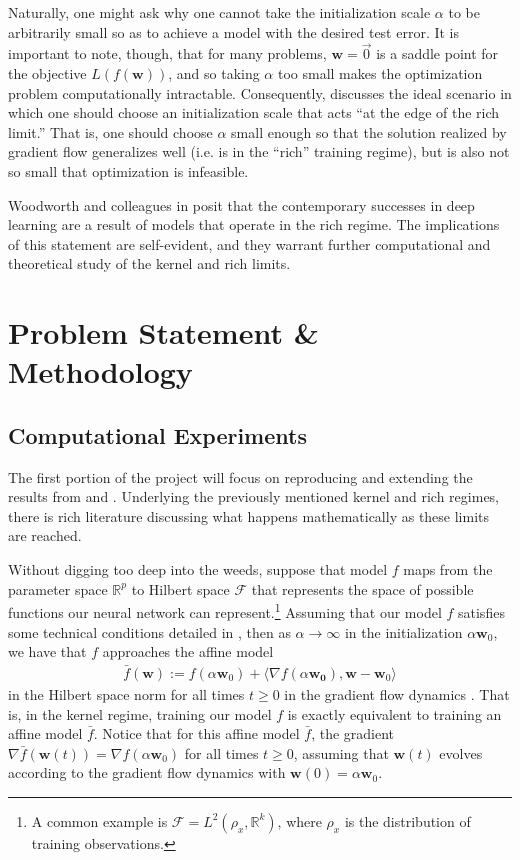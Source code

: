 \documentclass{article}
\begin{document}
Naturally, one might ask why one cannot take the initialization scale $\alpha$ to be arbitrarily small so as to achieve a model with the desired test error. It is important to note, though, that for many problems, $\boldsymbol{w} = \vec{0}$ is a saddle point for the objective $L(f(\boldsymbol{w}))$, and so taking $\alpha$ too small makes the optimization problem computationally intractable. Consequently, \cite{woodworth2020kernel} discusses the ideal scenario in which one should choose an initialization scale that acts \enquote{at the edge of the rich limit.} That is, one should choose $\alpha$ small enough so that the solution realized by gradient flow generalizes well (i.e. is in the \enquote{rich} training regime), but is also not so small that optimization is infeasible. 

Woodworth and colleagues in \cite{woodworth2020kernel} posit that the contemporary successes in deep learning are a result of models that operate in the rich regime. The implications of this statement are self-evident, and they warrant further computational and theoretical study of the kernel and rich limits.

\section{Problem Statement \& Methodology}
\subsection{Computational Experiments}
The first portion of the project will focus on reproducing and extending the results from \cite{chizat2018lazy} and \cite{woodworth2020kernel}. Underlying the previously mentioned kernel and rich regimes, there is rich literature discussing what happens mathematically as these limits are reached. 

Without digging too deep into the weeds, suppose that model $f$ maps from the parameter space $\mathbb{R}^p$ to Hilbert space $\mathcal{F}$ that represents  the space of possible functions our neural network can represent.\footnote{A common example is $\mathcal{F} = L^2(\rho_x, \mathbb{R}^k)$, where $\rho_x$ is the distribution of training observations.} Assuming that our model $f$ satisfies some technical conditions detailed in \cite{chizat2018lazy}, then as $\alpha \rightarrow \infty$ in the initialization $\alpha \boldsymbol{w}_0$, we have that $f$ approaches the affine model 
\begin{align}\label{linearizedmodel}
    \bar{f}(\boldsymbol{w}) := f(\alpha \boldsymbol{w}_0) + \langle \nabla f(\alpha\boldsymbol{w_0}), \boldsymbol{w} - \boldsymbol{w}_0 \rangle
\end{align}
in the Hilbert space norm for all times $t \geq 0$ in the gradient flow dynamics \cite{chizat2018lazy}. That is, in the kernel regime, training our model $f$ is exactly equivalent to training an affine model $\bar{f}$. Notice that for this affine model $\bar{f}$, the gradient $\nabla \bar{f}(\boldsymbol{w}(t)) = \nabla f(\alpha \boldsymbol{w}_0)$ for all times $t \geq 0$, assuming that $\boldsymbol{w}(t)$ evolves according to the gradient flow dynamics with $\boldsymbol{w}(0) = \alpha \boldsymbol{w}_0$.
\end{document}
